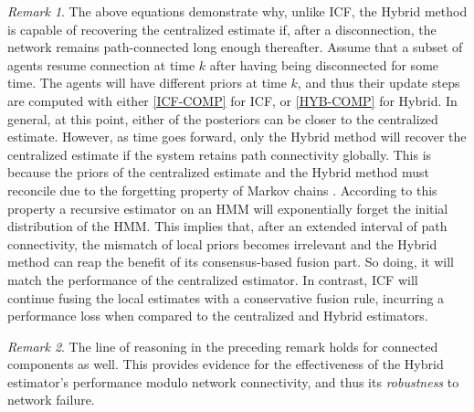 \documentclass[conference]{IEEEtran}
\theoremstyle{remark}
\newtheorem{remark}{Remark}
\begin{document}
\begin{remark}
	The above equations demonstrate why, unlike ICF, the Hybrid method is capable 
	of 
	recovering the centralized estimate if, after a disconnection, the network 
	remains path-connected long enough thereafter. Assume that a subset of agents 
	resume connection at time $k$ after having being disconnected for some time. 
	The agents will have different priors at 
	time $k$, and thus their update steps are computed with either \eqref{ICF-COMP} 
	for ICF, or 
	\eqref{HYB-COMP} for Hybrid. 
	In general, at this point, either of  the 
	posteriors can be closer to the centralized estimate. 
	However, as time 
	goes forward, only the Hybrid method 
	will recover the centralized estimate if the system retains path 
	connectivity globally.
	This is 
	because the priors of 
	the centralized estimate and the 
	Hybrid method must reconcile due to the forgetting property of Markov chains 
	\cite{anderson1997forgetting}. According to this property a recursive 
	estimator on an HMM will exponentially forget the initial distribution of 
	the HMM. This implies that, after an extended interval of path connectivity, 
	the mismatch of local priors becomes irrelevant and the Hybrid method can 
    reap the benefit of its consensus-based fusion part. So doing, it will
    match the performance of the centralized estimator. In contrast, ICF will
    continue fusing the local estimates with a conservative fusion rule, 
    incurring a performance loss when compared to the centralized and Hybrid
    estimators.

\end{remark}

\begin{remark}
	The line of reasoning in the preceding remark holds for connected components as 
	well. This provides evidence 
	for the effectiveness of the Hybrid estimator's performance modulo network 
	connectivity, and thus its \textit{robustness} to network failure.
\end{remark}


\normalfont
\end{document}
